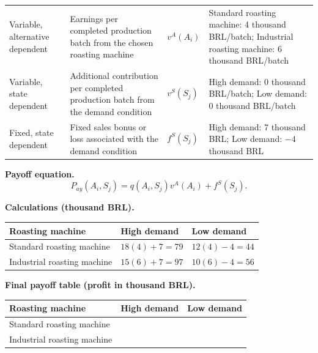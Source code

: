 {\begin{center}
\begin{tabularx}{\textwidth}{
					>{\raggedright\arraybackslash}X
					>{\raggedright\arraybackslash}X
					>{\centering\arraybackslash}p{}
					>{\raggedright\arraybackslash}X
				}
				Variable, alternative dependent
				&
				Earnings per completed production batch from the chosen roasting machine
				&
				$v^A(A_i)$
				&
				Standard roasting machine: 4 thousand BRL/batch; Industrial roasting machine: 6 thousand BRL/batch
				\\
				
				Variable, state dependent
				&
				Additional contribution per completed production batch from the demand condition
				&
				$v^S(S_j)$
				&
				High demand: 0 thousand BRL/batch; Low demand: 0 thousand BRL/batch
				\\
				
				Fixed, state dependent
				&
				Fixed sales bonus or loss associated with the demand condition
				&
				$f^S(S_j)$
				&
				High demand: 7 thousand BRL; Low demand: $-4$ thousand BRL
				\\
				\bottomrule
			\end{tabularx}
		\end{center}
		
		\textbf{Payoff equation.}
		\[
		P_{ay}(A_i,S_j)
		=
		q(A_i,S_j)v^A(A_i)
		+
		f^S(S_j).
		\]
		
		\textbf{Calculations (thousand BRL).}
		
		\begin{center}
			\begin{tabularx}{\textwidth}{
					>{\raggedright\arraybackslash}X
					>{\centering\arraybackslash}X
					>{\centering\arraybackslash}X
				}
				\toprule
				Roasting machine & High demand & Low demand \\
				\midrule
				Standard roasting machine
				&
				$18(4)+7=79$
				&
				$12(4)-4=44$
				\\
				
				Industrial roasting machine
				&
				$15(6)+7=97$
				&
				$10(6)-4=56$
				\\
				\bottomrule
			\end{tabularx}
		\end{center}
		
		\textbf{Final payoff table (profit in thousand BRL).}
		
		\begin{center}
			\begin{tabularx}{\textwidth}{
					>{\raggedright\arraybackslash}X
					>{\centering\arraybackslash}X
					>{\centering\arraybackslash}X
				}
				\toprule
				Roasting machine & High demand & Low demand \\
				\midrule
				Standard roasting machine & 79 & 44 \\
				Industrial roasting machine & 97 & 56 \\
				\bottomrule
			\end{tabularx}
		\end{center}
		
		\vspace{-5mm}
	}
	
